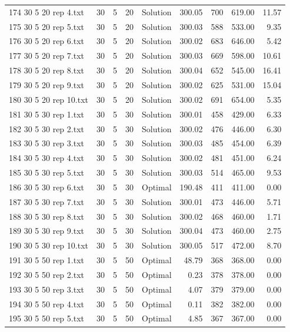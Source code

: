 \begin{longtable}{lrrllrrrr}
174 30 5 20 rep 4.txt & 30 & 5 & 20 & Solution & 300.05 & 700 & 619.00 & 11.57\\
175 30 5 20 rep 5.txt & 30 & 5 & 20 & Solution & 300.03 & 588 & 533.00 &  9.35\\
176 30 5 20 rep 6.txt & 30 & 5 & 20 & Solution & 300.02 & 683 & 646.00 &  5.42\\
177 30 5 20 rep 7.txt & 30 & 5 & 20 & Solution & 300.03 & 669 & 598.00 & 10.61\\
178 30 5 20 rep 8.txt & 30 & 5 & 20 & Solution & 300.04 & 652 & 545.00 & 16.41\\
179 30 5 20 rep 9.txt & 30 & 5 & 20 & Solution & 300.02 & 625 & 531.00 & 15.04\\
180 30 5 20 rep 10.txt & 30 & 5 & 20 & Solution & 300.02 & 691 & 654.00 &  5.35\\
181 30 5 30 rep 1.txt & 30 & 5 & 30 & Solution & 300.01 & 458 & 429.00 &  6.33\\
182 30 5 30 rep 2.txt & 30 & 5 & 30 & Solution & 300.02 & 476 & 446.00 &  6.30\\
183 30 5 30 rep 3.txt & 30 & 5 & 30 & Solution & 300.03 & 485 & 454.00 &  6.39\\
184 30 5 30 rep 4.txt & 30 & 5 & 30 & Solution & 300.02 & 481 & 451.00 &  6.24\\
185 30 5 30 rep 5.txt & 30 & 5 & 30 & Solution & 300.03 & 514 & 465.00 &  9.53\\
186 30 5 30 rep 6.txt & 30 & 5 & 30 & Optimal & 190.48 & 411 & 411.00 &  0.00\\
187 30 5 30 rep 7.txt & 30 & 5 & 30 & Solution & 300.01 & 473 & 446.00 &  5.71\\
188 30 5 30 rep 8.txt & 30 & 5 & 30 & Solution & 300.02 & 468 & 460.00 &  1.71\\
189 30 5 30 rep 9.txt & 30 & 5 & 30 & Solution & 300.04 & 473 & 460.00 &  2.75\\
190 30 5 30 rep 10.txt & 30 & 5 & 30 & Solution & 300.05 & 517 & 472.00 &  8.70\\
191 30 5 50 rep 1.txt & 30 & 5 & 50 & Optimal & 48.79 & 368 & 368.00 &  0.00\\
192 30 5 50 rep 2.txt & 30 & 5 & 50 & Optimal &  0.23 & 378 & 378.00 &  0.00\\
193 30 5 50 rep 3.txt & 30 & 5 & 50 & Optimal &  4.07 & 379 & 379.00 &  0.00\\
194 30 5 50 rep 4.txt & 30 & 5 & 50 & Optimal &  0.11 & 382 & 382.00 &  0.00\\
195 30 5 50 rep 5.txt & 30 & 5 & 50 & Optimal &  4.85 & 367 & 367.00 &  0.00\\

\end{longtable}
